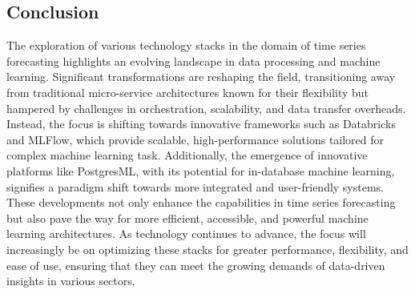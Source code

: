\subsection{Conclusion}
The exploration of various technology stacks in the domain of time series forecasting highlights an evolving landscape in data processing and machine learning. 
Significant transformations are reshaping the field, transitioning away from traditional micro-service architectures known for their flexibility but hampered by challenges in orchestration, scalability, and data transfer overheads. Instead, the focus is shifting towards innovative frameworks such as Databricks and MLFlow, which provide scalable, high-performance solutions tailored for complex machine learning task. Additionally, the emergence of innovative platforms like PostgresML, with its potential for in-database machine learning, signifies a paradigm shift towards more integrated and user-friendly systems. These developments not only enhance the capabilities in time series forecasting but also pave the way for more efficient, accessible, and powerful machine learning architectures. As technology continues to advance, the focus will increasingly be on optimizing these stacks for greater performance, flexibility, and ease of use, ensuring that they can meet the growing demands of data-driven insights in various sectors.

